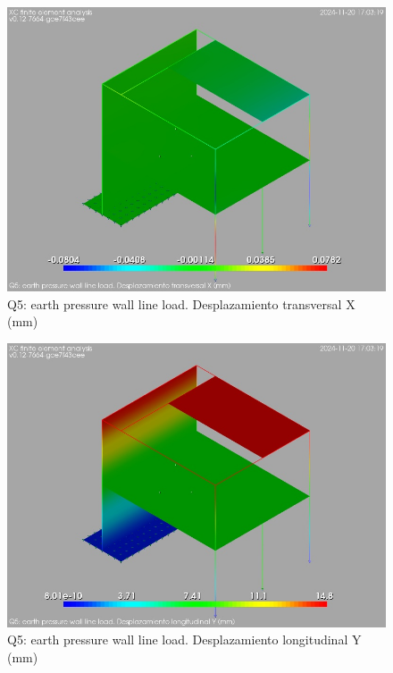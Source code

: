 \begin{figure}[ht]
\begin{center}
\includegraphics[width=\linewidth]{results/graphics/resSimplLC/QearthPWallLinLuX.png}
\caption{Q5: earth pressure wall line load. Desplazamiento transversal X (mm)}
\label{QearthPWallLinLuX}
\end{center}
\end{figure}
\begin{figure}[ht]
\begin{center}
\includegraphics[width=\linewidth]{results/graphics/resSimplLC/QearthPWallLinLuY.png}
\caption{Q5: earth pressure wall line load. Desplazamiento longitudinal Y (mm)}
\label{QearthPWallLinLuY}
\end{center}
\end{figure}
